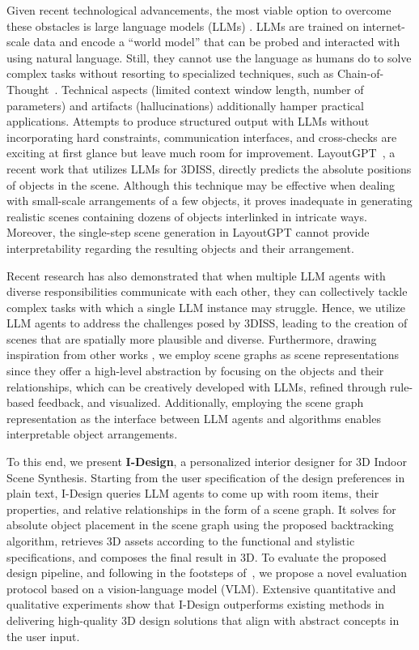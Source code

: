 \documentclass[runningheads]{llncs}
\newcommand{\methodname}{I-Design\xspace}
\begin{document}
Given recent technological advancements, the most viable option to overcome these obstacles is large language models (LLMs) \cite{yang2023harnessing, achiam2023gpt}.
LLMs are trained on internet-scale data and encode a ``world model'' that can be probed and interacted with using natural language.
Still, they cannot use the language as humans do to solve complex tasks without resorting to specialized techniques, such as Chain-of-Thought~\cite{wei2022chain}. 
Technical aspects (\eg limited context window length, number of parameters) and artifacts (\eg hallucinations) additionally hamper practical applications. 
Attempts to produce structured output with LLMs without incorporating hard constraints, communication interfaces, and cross-checks are exciting at first glance but leave much room for improvement. 
LayoutGPT~\cite{feng2023layoutgpt}, a recent work that utilizes LLMs for 3DISS,  directly predicts the absolute positions of objects in the scene. Although this technique may be effective when dealing with small-scale arrangements of a few objects, it proves inadequate in generating realistic scenes containing dozens of objects interlinked in intricate ways. Moreover, the single-step scene generation in LayoutGPT cannot provide interpretability regarding the resulting objects and their arrangement.

Recent research \cite{yang2023auto, qian2023communicative} has also demonstrated that when multiple LLM agents with diverse responsibilities communicate with each other, they can collectively tackle complex tasks with which a single LLM instance may struggle. Hence, we utilize LLM agents to address the challenges posed by 3DISS, leading to the creation of scenes that are spatially more plausible and diverse. Furthermore, drawing inspiration from other works \cite{armeni20193d, chang2015text, zhai2023commonscenes, wang2019planit}, we employ scene graphs as scene representations since they offer a high-level abstraction by focusing on the objects and their relationships, which can be creatively developed with LLMs, refined through rule-based feedback, and visualized. Additionally, employing the scene graph representation as the interface between LLM agents and algorithms enables interpretable object arrangements.

To this end, we present \textbf{\methodname}, a personalized interior designer for 3D Indoor Scene Synthesis. Starting from the user specification of the design preferences in plain text, \methodname queries LLM agents to come up with room items, their properties, and relative relationships in the form of a scene graph. It solves for absolute object placement in the scene graph using the proposed backtracking algorithm, retrieves 3D assets according to the functional and stylistic specifications, and composes the final result in 3D. 
To evaluate the proposed design pipeline, and following in the footsteps of~\cite{wu2024gpt}, we propose a novel evaluation protocol based on a vision-language model (VLM). 
Extensive quantitative and qualitative experiments show that \methodname outperforms existing methods in delivering high-quality 3D design solutions that align with abstract concepts in the user input. 
\end{document}

